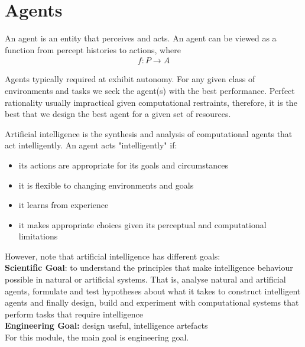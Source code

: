 \documentclass[a4paper]{article}
\theoremstyle{plain}
\theoremstyle{definition}
\newtheorem{defn}{Definition}[section]
\theoremstyle{remark}
\begin{document}
	\section{Agents}
	\begin{tcolorbox}[colback=black!3!white,colframe=black!60!white,title=\begin{defn}Agent \label{Agent}\end{defn}]
	An agent is an entity that perceives and acts. An agent can be viewed as a function from percept histories to actions, where
	\begin{align*}
		f : P \to A
	\end{align*}
	\end{tcolorbox}
	Agents typically required at exhibit autonomy. For any given class of environments and tasks we seek the agent(s) with the best performance. Perfect rationality usually impractical given computational restraints, therefore, it is the best that we design the best agent for a given set of resources.
	\begin{tcolorbox}[colback=black!3!white,colframe=black!60!white,title=\begin{defn}Artifical Intelligence \label{Artificial Intelligence}\end{deft}]
	Artificial intelligence is the synthesis and analysis of computational agents that act intelligently. An agent acts "intelligently" if:
	\begin{itemize}
		\item its actions are appropriate for its goals and circumstances
		\item it is flexible to changing environments and goals
		\item it learns from experience
		\item it makes appropriate choices given its perceptual and computational limitations
	\end{itemize}
	\end{tcolorbox}
	However, note that artificial intelligence has different goals: \\
\textbf{Scientific Goal}: to understand the principles that make intelligence behaviour possible in natural or artificial systems. That is, analyse natural and artificial agents, formulate and test hypotheses about what it takes to construct intelligent agents and finally design, build and experiment with computational systems that perform tasks that require intelligence\\
\textbf{Engineering Goal:} design useful, intelligence artefacts \\
For this module, the main goal is engineering goal. \\
\end{document}
